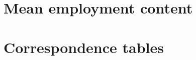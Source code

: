 \documentclass[12pt,english]{article}
\begin{document}
\newpage


\clearpage

\appendix

\section{Mean employment content} \label{ECmean}


\section{Correspondence tables}
\end{document}

